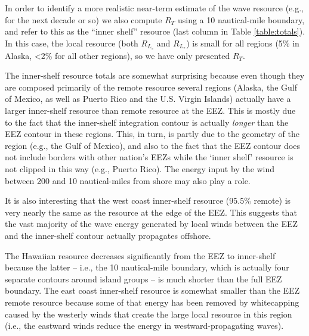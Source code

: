 In order to identify a more realistic near-term estimate of the wave resource (e.g., for the next decade or so) we also compute $R_T$ using a 10 nautical-mile boundary, and refer to this as the ``inner shelf'' resource (last column in Table \ref{table:totals}). In this case, the local resource (both $R_{L_\circ}$ and $R_{L_*}$) is small for all regions (5\% in Alaska, <2\% for all other regions), so we have only presented $R_T$.

The inner-shelf resource totals are somewhat surprising because even though they are composed primarily of the remote resource several regions (Alaska, the Gulf of Mexico, as well as Puerto Rico and the U.S. Virgin Islands) actually have a larger inner-shelf resource than remote resource at the EEZ. This is mostly due to the fact that the inner-shelf integration contour is actually {\em longer} than the EEZ contour in these regions. This, in turn, is partly due to the geometry of the region (e.g., the Gulf of Mexico), and also to the fact that the EEZ contour does not include borders with other nation's EEZs while the `inner shelf' resource is not clipped in this way (e.g., Puerto Rico). The energy input by the wind between 200 and 10 nautical-miles from shore may also play a role. 

It is also interesting that the west coast inner-shelf resource (95.5\% remote) is very nearly the same as the resource at the edge of the EEZ. This suggests that the vast majority of the wave energy generated by local winds between the EEZ and the inner-shelf contour actually propagates offshore.

The Hawaiian resource decreases significantly from the EEZ to inner-shelf because the latter -- i.e., the 10 nautical-mile boundary, which is actually four separate contours around island groups -- is much shorter than the full EEZ boundary. The east coast inner-shelf resource is somewhat smaller than the EEZ remote resource because some of that energy has been removed by whitecapping caused by the westerly winds that create the large local resource in this region (i.e., the eastward winds reduce the energy in westward-propagating waves).

